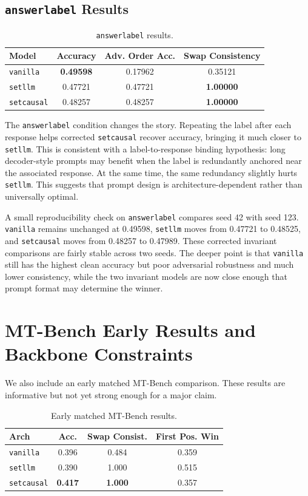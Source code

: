 \documentclass{article}
\begin{document}
\subsection{\texttt{answerlabel} Results}

\begin{table}[t]
\centering
\small
\begin{tabular}{lccc}
\toprule
Model & Accuracy & Adv. Order Acc. & Swap Consistency \\
\midrule
\texttt{vanilla} & \textbf{0.49598} & 0.17962 & 0.35121 \\
\texttt{setllm} & 0.47721 & 0.47721 & \textbf{1.00000} \\
\texttt{setcausal} & 0.48257 & 0.48257 & \textbf{1.00000} \\
\bottomrule
\end{tabular}
\caption{\texttt{answerlabel} results.}
\label{tab:answerlabel}
\end{table}

The \texttt{answerlabel} condition changes the story. Repeating the label after each response helps corrected \texttt{setcausal} recover accuracy, bringing it much closer to \texttt{setllm}. This is consistent with a label-to-response binding hypothesis: long decoder-style prompts may benefit when the label is redundantly anchored near the associated response. At the same time, the same redundancy slightly hurts \texttt{setllm}. This suggests that prompt design is architecture-dependent rather than universally optimal.

A small reproducibility check on \texttt{answerlabel} compares seed 42 with seed 123. \texttt{vanilla} remains unchanged at 0.49598, \texttt{setllm} moves from 0.47721 to 0.48525, and \texttt{setcausal} moves from 0.48257 to 0.47989. These corrected invariant comparisons are fairly stable across two seeds. The deeper point is that \texttt{vanilla} still has the highest clean accuracy but poor adversarial robustness and much lower consistency, while the two invariant models are now close enough that prompt format may determine the winner.

\section{MT-Bench Early Results and Backbone Constraints}

We also include an early matched MT-Bench comparison. These results are informative but not yet strong enough for a major claim.

\begin{table}[t]
\centering
\small
\begin{tabular}{lccc}
\toprule
Arch & Acc. & Swap Consist. & First Pos. Win \\
\midrule
\texttt{vanilla} & 0.396 & 0.484 & 0.359 \\
\texttt{setllm} & 0.390 & 1.000 & 0.515 \\
\texttt{setcausal} & \textbf{0.417} & \textbf{1.000} & 0.357 \\
\bottomrule
\end{tabular}
\caption{Early matched MT-Bench results.}
\label{tab:mtbench-early}
\end{table}
\end{document}

